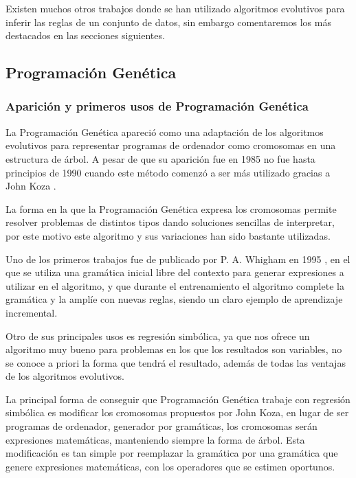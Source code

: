 Existen muchos otros trabajos donde se han utilizado algoritmos evolutivos para inferir las reglas de un conjunto de datos, sin embargo comentaremos los más destacados en las secciones siguientes.

\subsection{Programación Genética}

\subsubsection{Aparición y primeros usos de Programación Genética}


La Programación Genética apareció como una adaptación de los algoritmos evolutivos para representar programas de ordenador como cromosomas en una estructura de árbol. A pesar de que su aparición fue en 1985 no fue hasta principios de 1990 cuando este método comenzó a ser más utilizado gracias a John Koza \cite{kozaGP}.

La forma en la que la Programación Genética expresa los cromosomas permite resolver problemas de distintos tipos dando soluciones sencillas de interpretar, por este motivo este algoritmo y sus variaciones han sido bastante utilizadas.

Uno de los primeros trabajos fue de publicado por P. A. Whigham en 1995 \cite{PGgramaticas}, en el que se utiliza una gramática inicial libre del contexto para generar expresiones a utilizar en el algoritmo, y que durante el entrenamiento el algoritmo complete la gramática y la amplíe con nuevas reglas, siendo un claro ejemplo de aprendizaje incremental.


Otro de sus principales usos es regresión simbólica, ya que nos ofrece un algoritmo muy bueno para problemas en los que los resultados son variables, no se conoce a priori la forma que tendrá el resultado, además de todas las ventajas de los algoritmos evolutivos.

La principal forma de conseguir que Programación Genética trabaje con regresión simbólica es modificar los cromosomas propuestos por John Koza, en lugar de ser programas de ordenador, generador por gramáticas, los cromosomas serán expresiones matemáticas, manteniendo siempre la forma de árbol. Esta modificación es tan simple por reemplazar la gramática por una gramática que genere expresiones matemáticas, con los operadores que se estimen oportunos.

